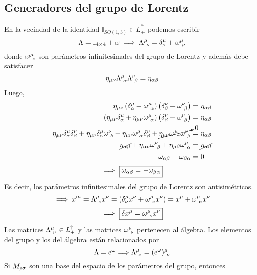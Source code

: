 \subsection{Generadores del grupo de Lorentz}
En la vecindad de la identidad $\mathbb{I}_{SO(1,3)}\in L^\uparrow_+ $ podemos escribir
\begin{equation}
  \Lambda=\mathbb{I}_{4\times 4}+\omega \implies \Lambda^\mu_{~\nu }=\delta^\mu_\nu +\omega^\mu_{~\nu }
\end{equation}
donde $\omega^\mu_{~\nu }$ son parámetros infinitesimales del grupo de Lorentz y además debe satisfacer
\begin{equation}
 \eta_{\mu\nu }\Lambda^\mu_{~\alpha} \Lambda^\nu _{~\beta }=\eta_{\alpha\beta  }
\end{equation}
Luego,
\begin{align}
  \eta_{\mu\nu }\left(\delta^\mu_\alpha +\omega^\mu_{~\alpha }\right)\left(\delta^\nu_\beta  +\omega^\nu_{~\beta  }\right)&=\eta_{\alpha\beta }\\
  \left(\eta_{\mu\nu}\delta^\mu_\alpha+\eta_{\mu\nu }\omega^\mu_{~\alpha }\right)\left(\delta^\nu_\beta  +\omega^\nu_{~\beta  }\right)&=\eta_{\alpha\beta }\\
  \eta_{\mu\nu}\delta^\mu_\alpha\delta^\nu_\beta +\eta_{\mu\nu}\delta^\mu_\alpha\omega^\nu_{~b}+\eta_{\mu\nu }\omega^\mu_{~\alpha }\delta^\nu_\beta+\cancelto{0}{\eta_{\mu\nu }\omega^\mu_{~\alpha }\omega^\nu_{~\beta}}&=\eta_{\alpha\beta }\\
  \cancel{\eta_{\alpha\beta }}+\eta_{\alpha\nu  }\omega^\nu _{~\beta }+\eta_{\mu\beta }\omega^\mu_{~\alpha}&=\cancel{\eta_{\alpha\beta }}\\
  \omega_{\alpha\beta }+\omega_{\beta\alpha}&=0
\end{align}
\begin{equation}
  \implies \boxed{\omega_{\alpha\beta}=-\omega_{\beta\alpha }}
\end{equation}
Es decir, los parámetros infinitesimales del grupo de Lorentz son antisimétricos.
\begin{equation}
  \implies x'^\mu =\Lambda^\mu_{~\nu } x^\nu =(\delta^\mu_\nu x^\nu+\omega^\mu_{~\nu } x^\nu )=x^\mu +\omega^\mu_{~\nu } x^\nu 
\end{equation}
\begin{equation}\label{12.1}
  \implies\boxed{ \delta x^\mu =\omega^\mu_{~\nu } x^\nu }
\end{equation}
Las matrices $\Lambda^\mu_{~\nu }\in L^\uparrow_+$ y las matrices $\omega^\mu_{~\nu }$ pertenecen al álgebra. Los elementos del grupo y los del álgebra están relacionados por
\begin{equation}
  \Lambda=e^\omega \Longrightarrow \Lambda^\mu_{~\nu } =(e^\omega )^\mu_{~\nu }
\end{equation}
Si $M_{\rho\sigma }$ son una base del espacio de los parámetros del grupo, entonces
